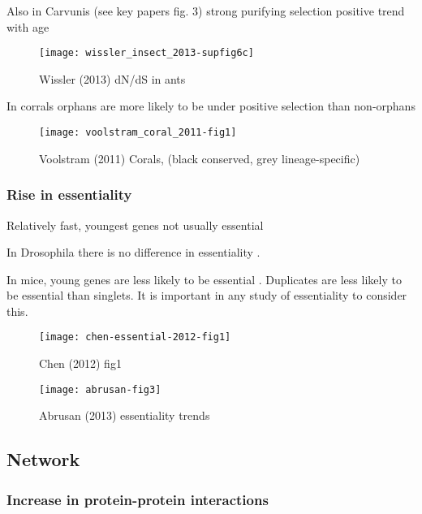         Also in Carvunis (see key papers fig. 3) strong purifying selection
        positive trend with age \cite{carvunis_proto-genes_2012}

        \begin{figure}[!hbpt] \centering
            \texttt{[image: wissler\_insect\_2013-supfig6c]}
            \caption{ Wissler (2013) dN/dS in ants
                \cite{wissler_mechanisms_2013} }
        \end{figure}

        In corrals orphans are more likely to be under positive selection
        than non-orphans \cite{voolstra_rapid_2011}

        \begin{figure}[!hbpt] \centering
            \texttt{[image: voolstram\_coral\_2011-fig1]}
            \caption{ Voolstram (2011) Corals, (black conserved, grey
                lineage-specific) \cite{voolstra_rapid_2011} }
        \end{figure}

        \FloatBarrier

    \subsubsection{Rise in essentiality}

        Relatively fast, youngest genes not usually essential
        \cite{abrusan_integration_2013}

        In Drosophila there is no difference in essentiality
        \cite{chen_new_2010}. 

        In mice, young genes are less likely to be essential
        \cite{chen_younger_2012}. Duplicates are less likely to be essential
        than singlets. It is important in any study of essentiality to consider
        this.

        \begin{figure}[!hbpt]
            \centering
            \texttt{[image: chen-essential-2012-fig1]}
            \caption{Chen (2012) fig1 \cite{chen_younger_2012}}
        \end{figure}

        \begin{figure}[!hbpt] \centering
            \texttt{[image: abrusan-fig3]}
            \caption{Abrusan (2013) essentiality trends}
        \end{figure}
        \FloatBarrier


\subsection{Network} \subsubsection{Increase in protein-protein
interactions}

